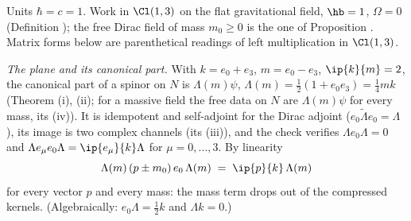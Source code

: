 Units $\hbar = c = 1$. Work in $\Cl(1,3)$ on the flat gravitational field, $\hb = 1$, $\Omega = 0$ (Definition ); the free Dirac field of mass $m_{0} \ge 0$ is the one of Proposition . Matrix forms below are parenthetical readings of left multiplication in $\Cl(1,3)$.

\emph{The plane and its canonical part.} With $k = e_{0} + e_{3}$, $m = e_{0} - e_{3}$, $\ip{k}{m} = 2$, the canonical part of a spinor on $N$ is $\Lambda(m)\psi$, $\Lambda(m) = \tfrac12(1 + e_{0}e_{3}) = \tfrac14 mk$ (Theorem (i), (ii); for a massive field the free data on $N$ are $\Lambda(m)\psi$ for every mass, its (iv)). It is idempotent and self-adjoint for the Dirac adjoint ($e_{0}\tilde\Lambda e_{0} = \Lambda$), its image is two complex channels (its (iii)), and the check verifies $\Lambda e_{0}\Lambda = 0$ and $\Lambda e_{\mu}e_{0}\Lambda = \ip{e_{\mu}}{k}\Lambda$ for $\mu = 0, \dots, 3$. By linearity
\[
\Lambda(m)\,(p \pm m_{0})\,e_{0}\,\Lambda(m) \;=\; \ip{p}{k}\,\Lambda(m)
\]
for every vector $p$ and every mass: the mass term drops out of the compressed kernels. (Algebraically: $e_{0}\Lambda = \tfrac12 k$ and $\Lambda k = 0$.)


